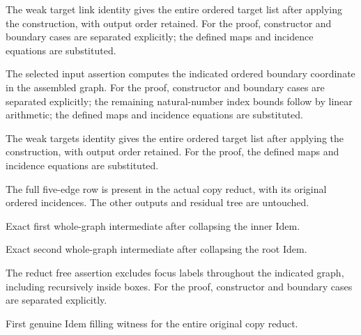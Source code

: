 The weak target link identity gives the entire ordered target list after applying the construction, with output order retained.
For the proof, constructor and boundary cases are separated explicitly; the defined maps and incidence equations are substituted.
\par{}

The selected input assertion computes the indicated ordered boundary coordinate in the assembled graph.
For the proof, constructor and boundary cases are separated explicitly; the remaining natural-number index bounds follow by linear arithmetic; the defined maps and incidence equations are substituted.
\par{}

The weak targets identity gives the entire ordered target list after applying the construction, with output order retained.
For the proof, the defined maps and incidence equations are substituted.
\par{}

The full five-edge row is present in the actual copy reduct, with its original ordered incidences. The other outputs and residual tree are untouched.
\par{}

Exact first whole-graph intermediate after collapsing the inner Idem.
\par{}

Exact second whole-graph intermediate after collapsing the root Idem.
\par{}

The reduct free assertion excludes focus labels throughout the indicated graph, including recursively inside boxes.
For the proof, constructor and boundary cases are separated explicitly.
\par{}

First genuine Idem filling witness for the entire original copy reduct.
\par{}

